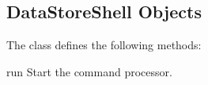 \documentclass{howto}
\begin{document}
\subsection{DataStoreShell Objects}

The  class defines the following methods:

\begin{methoddesc}{run}{}
Start the command processor.

\end{methoddesc}

\renewcommand{\indexname}{Module Index}

\renewcommand{\indexname}{Index}
\end{document}
